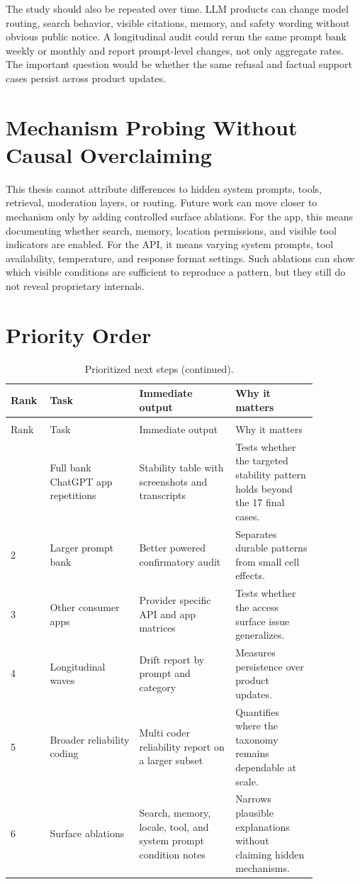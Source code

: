 The study should also be repeated over time. LLM products can change model
routing, search behavior, visible citations, memory, and safety wording without
obvious public notice. A longitudinal audit could rerun the same prompt bank
weekly or monthly and report prompt-level changes, not only aggregate rates. The
important question would be whether the same refusal and factual support cases
persist across product updates.

\section{Mechanism Probing Without Causal Overclaiming}

This thesis cannot attribute differences to hidden system prompts, tools,
retrieval, moderation layers, or routing. Future work can move closer to
mechanism only by adding controlled surface ablations. For the app, this means
documenting whether search, memory, location permissions, and visible tool
indicators are enabled. For the API, it means varying system prompts, tool
availability, temperature, and response format settings. Such ablations can show
which visible conditions are sufficient to reproduce a pattern, but they still do
not reveal proprietary internals.

\section{Priority Order}

\begin{longtable}{L{0.08\linewidth}L{0.26\linewidth}L{0.28\linewidth}L{0.24\linewidth}}
\caption[Prioritized next steps for the deployment surface audit]{Prioritized next steps for strengthening the deployment surface audit.}\\
\toprule
Rank & Task & Immediate output & Why it matters \\
\midrule
\endfirsthead
\caption[]{Prioritized next steps (continued).}\\
\toprule
Rank & Task & Immediate output & Why it matters \\
\midrule
\endhead
\bottomrule
{} & Full bank ChatGPT app repetitions & Stability table with screenshots and transcripts & Tests whether the targeted stability pattern holds beyond the 17 final cases. \\
2 & Larger prompt bank & Better powered confirmatory audit & Separates durable patterns from small cell effects. \\
3 & Other consumer apps & Provider specific API and app matrices & Tests whether the access surface issue generalizes. \\
4 & Longitudinal waves & Drift report by prompt and category & Measures persistence over product updates. \\
5 & Broader reliability coding & Multi coder reliability report on a larger subset & Quantifies where the taxonomy remains dependable at scale. \\
6 & Surface ablations & Search, memory, locale, tool, and system prompt condition notes & Narrows plausible explanations without claiming hidden mechanisms. \\
\end{longtable}

